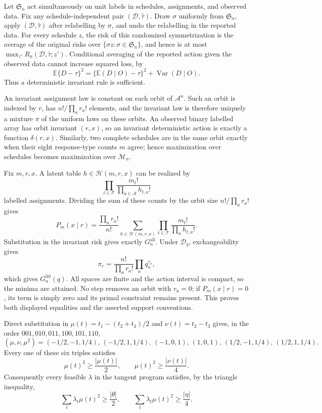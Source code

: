 Let \(\mathfrak S_n\) act simultaneously on unit labels in schedules, assignments, and observed data.  Fix any schedule-independent pair \((\mathcal D,\widehat\tau)\).  Draw \(\sigma\) uniformly from \(\mathfrak S_n\), apply \((\mathcal D,\widehat\tau)\) after relabelling by \(\sigma\), and undo the relabelling in the reported data.  For every schedule \(z\), the risk of this randomized symmetrization is the average of the original risks over \(\{\sigma z:\sigma\in\mathfrak S_n\}\), and hence is at most \(\max_{z'}R_n(\mathcal D,\widehat\tau;z')\).  Conditional averaging of the reported action given the observed data cannot increase squared loss, by
\[
  \mathbb E\{D-\tau\}^2
  =\{\mathbb E(D\mid O)-\tau\}^2+\operatorname{Var}(D\mid O).
\]
Thus a deterministic invariant rule is sufficient.

An invariant assignment law is constant on each orbit of \(\mathcal A^n\).  Such an orbit is indexed by \(r\), has \(n!/\prod_a r_a!\) elements, and the invariant law is therefore uniquely a mixture \(\pi\) of the uniform laws on these orbits.  An observed binary labelled array has orbit invariant \((r,x)\), so an invariant deterministic action is exactly a function \(\delta(r,x)\).  Similarly, two complete schedules are in the same orbit exactly when their eight response-type counts \(m\) agree; hence maximization over schedules becomes maximization over \(\mathcal M_n\).

Fix \(m,r,x\).  A latent table \(h\in\mathcal H(m,r,x)\) can be realized by
\[
  \prod_{t\in\mathcal T}\frac{m_t!}{\prod_{a\in\mathcal A}h_{t,a}!}
\]
labelled assignments.  Dividing the sum of these counts by the orbit size \(n!/\prod_a r_a!\) gives
\[
 P_m(x\mid r)
 =\frac{\prod_a r_a!}{n!}
   \sum_{h\in\mathcal H(m,r,x)}
   \prod_{t\in\mathcal T}\frac{m_t!}{\prod_a h_{t,a}!}.
\]
Substitution in the invariant risk gives exactly \(G_n^{\mathrm{all}}\).  Under \(\mathcal D_q\), exchangeability gives
\[
 \pi_r=\frac{n!}{\prod_a r_a!}\prod_aq_a^{r_a},
\]
which gives \(G_n^{\mathrm{iid}}(q)\).  All spaces are finite and the action interval is compact, so the minima are attained.  No step removes an orbit with \(r_a=0\); if \(P_m(x\mid r)=0\), its term is simply zero and its primal constraint remains present.  This proves both displayed equalities and the asserted support conventions.

Direct substitution in \(\mu(t)=t_1-(t_2+t_3)/2\) and \(\nu(t)=t_2-t_3\) gives, in the order \(001,010,011,100,101,110\),
\[
(\mu,\nu,\mu^2)
=(-1/2,-1,1/4),\,(-1/2,1,1/4),\,(-1,0,1),\,
  (1,0,1),\,(1/2,-1,1/4),\,(1/2,1,1/4).
\]
Every one of these six triples satisfies
\[
 \mu(t)^2\geq \frac{|\mu(t)|}{2},
 \qquad
 \mu(t)^2\geq \frac{|\nu(t)|}{4}.
\]
Consequently every feasible \(\lambda\) in the tangent program satisfies, by the triangle inequality,
\[
\sum_t\lambda_t\mu(t)^2\geq\frac{|\theta|}{2},
\qquad
\sum_t\lambda_t\mu(t)^2\geq\frac{|\eta|}{4}.
\]

